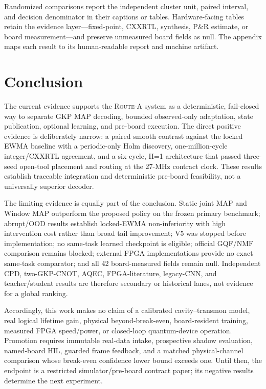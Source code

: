\documentclass[11pt]{article}
\newcommand{\RouteA}{\textsc{Route-A}}
\begin{document}
Randomized comparisons report the independent cluster unit, paired interval,
and decision denominator in their captions or tables.  Hardware-facing tables
retain the evidence layer---fixed-point, CXXRTL, synthesis, P\&R estimate, or
board measurement---and preserve unmeasured board fields as null.  The appendix
maps each result to its human-readable report and machine artifact.

\section{Conclusion}

The current evidence supports the \RouteA{} system as a deterministic,
fail-closed way to separate GKP MAP decoding, bounded observed-only adaptation,
state publication, optional learning, and pre-board execution.  The direct
positive evidence is deliberately narrow: a paired smooth contrast against the
locked EWMA baseline with a periodic-only Holm discovery, one-million-cycle
integer/CXXRTL agreement, and a six-cycle, II=1 architecture that passed
three-seed open-tool placement and routing at the 27-MHz contract clock.  These
results establish traceable integration and deterministic pre-board
feasibility, not a universally superior decoder.

The limiting evidence is equally part of the conclusion.  Static joint MAP and
Window MAP outperform the proposed policy on the frozen primary benchmark;
abrupt/OOD results establish locked-EWMA non-inferiority with high intervention
cost rather than broad tail improvement; V5 was stopped before implementation;
no same-task learned checkpoint is eligible; official GQF/NMF comparison
remains blocked; external FPGA implementations provide no exact same-task
comparator; and all 42 board-measured fields remain null.  Independent CPD,
two-GKP-CNOT, AQEC, FPGA-literature, legacy-CNN, and teacher/student results are
therefore secondary or historical lanes, not evidence for a global ranking.

Accordingly, this work makes no claim of a calibrated cavity--transmon model,
real logical lifetime gain, physical beyond-break-even, board-resident training,
measured FPGA speed/power, or closed-loop quantum-device operation.  Promotion
requires immutable real-data intake, prospective shadow evaluation, named-board
HIL, guarded frame feedback, and a matched physical-channel comparison whose
break-even confidence lower bound exceeds one.  Until then, the endpoint is a
restricted simulator/pre-board contract paper; its negative results determine
the next experiment.
\end{document}
